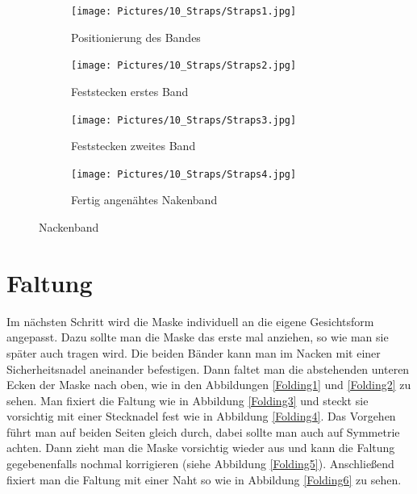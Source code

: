 \documentclass[12pt,parskip=full]{scrartcl}
\begin{document}
\begin{figure}[ht]
    \vspace{0.5cm}
    \centering
    \begin{subfigure}{0.48\textwidth}
        \centering
        \texttt{[image: Pictures/10\_Straps/Straps1.jpg]}
        \caption{Positionierung des Bandes}
        \label{Strap1}
    \end{subfigure}
    \begin{subfigure}{0.48\textwidth}
        \centering
        \texttt{[image: Pictures/10\_Straps/Straps2.jpg]}
        \caption{Feststecken erstes Band}
        \label{Strap2}
    \end{subfigure}
    \begin{subfigure}{0.48\textwidth}
        \centering
        \texttt{[image: Pictures/10\_Straps/Straps3.jpg]}
        \caption{Feststecken zweites Band}
        \label{Strap3}
    \end{subfigure}
    \begin{subfigure}{0.48\textwidth}
        \centering
        \texttt{[image: Pictures/10\_Straps/Straps4.jpg]}
        \caption{Fertig angenähtes Nakenband}
        \label{Strap4}
    \end{subfigure}
    \caption{Nackenband}
    \label{Strap}
\end{figure}

\section{Faltung}
Im nächsten Schritt wird die Maske individuell an die eigene Gesichtsform angepasst. Dazu sollte man die Maske das erste mal anziehen, so wie man sie später auch tragen wird. Die beiden Bänder kann man im Nacken mit einer Sicherheitsnadel aneinander befestigen. Dann faltet man die abstehenden unteren Ecken der Maske nach oben, wie in den Abbildungen \ref{Folding1} und \ref{Folding2} zu sehen. Man fixiert die Faltung wie in Abbildung \ref{Folding3} und steckt sie vorsichtig mit einer Stecknadel fest wie in Abbildung \ref{Folding4}. Das Vorgehen führt man auf beiden Seiten gleich durch, dabei sollte man auch auf Symmetrie achten. Dann zieht man die Maske vorsichtig wieder aus und kann die Faltung gegebenenfalls nochmal korrigieren (siehe Abbildung \ref{Folding5}). Anschließend fixiert man die Faltung mit einer Naht so wie in Abbildung \ref{Folding6} zu sehen. 
\end{document}
